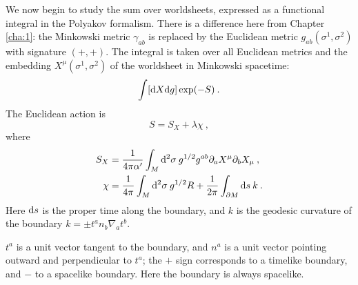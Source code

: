 We now begin to study the sum over worldsheets, expressed as a functional integral in the Polyakov formalism.    
There is a difference here from Chapter \ref{cha:1}: the Minkowski metric $\gamma_{ab}$ is replaced by the Euclidean metric $g_{a b}(\sigma^{1}, \sigma^{2})$ with signature $(+,+)$. The integral is taken over all Euclidean metrics and the embedding $X^{\mu}(\sigma^{1}, \sigma^{2})$ of the worldsheet in Minkowski spacetime:    
\begin{equation}\label{3.2.1}
	\int[\mathrm{d} X \mathrm{d} g] \exp (-S) \:.
\end{equation}
The Euclidean action is    
\begin{equation}
	S=S_{X}+\lambda \chi \:, \label{3.2.2}
\end{equation}
where    
\begin{subequations}\label{3.2.3}
	\begin{align}
		S_{X}&=\frac{1}{4 \pi \alpha^{\prime}} \int_{M} \mathrm{d}^{2} \sigma \: g^{1 / 2} g^{a b} \partial_{a} X^{\mu} \partial_{b} X_{\mu} \:, \label{3.2.3a} \\
		\chi&=\frac{1}{4 \pi} \int_{M} \mathrm{d}^{2} \sigma \: g^{1 / 2} R+\frac{1}{2 \pi} \int_{\partial M} \mathrm{d} s\: k \:.
		\label{3.2.3b}
	\end{align}
\end{subequations}
Here $\mathrm{d} s$ is the proper time along the boundary, and $k$ is the geodesic curvature of the boundary $k=\pm t^{a} n_{b} \nabla_{a} t^{b}$. \\    
\begin{remark}
	$t^a$ is a unit vector tangent to the boundary, and $n^a$ is a unit vector pointing outward and perpendicular to $t^a$; the $+$ sign corresponds to a timelike boundary, and $-$ to a spacelike boundary. Here the boundary is always spacelike.    
\end{remark}
